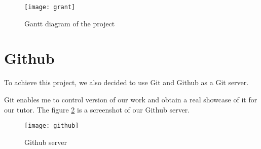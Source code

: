 \begin{figure}[h]
  \centering
  \texttt{[image: grant]}
  \caption{Gantt diagram of the project}
  \label{fig:grantt}
\end{figure}


\section{Github}

To achieve this project, we also decided to use Git and Github as a Git server. ~\\


Git enables me to control version of our work and obtain a real showcase of it for our tutor. The figure
\ref{fig:github} is a screenshot of our Github server.

\begin{figure}[h]
  \centering
  \texttt{[image: github]}
  \caption{Github server}
  \label{fig:github}
\end{figure}




